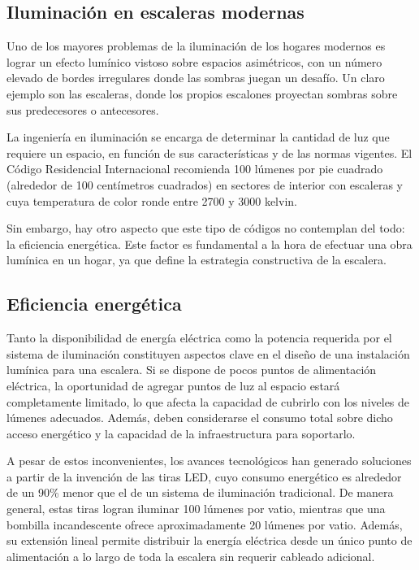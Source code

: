 \subsection{Iluminación en escaleras modernas}

Uno de los mayores problemas de la iluminación de los hogares modernos es lograr un efecto lumínico vistoso sobre espacios asimétricos, con un número elevado de bordes irregulares donde las sombras juegan un desafío. Un claro ejemplo son las escaleras, donde los propios escalones proyectan sombras sobre sus predecesores o antecesores. 

La ingeniería en iluminación se encarga de determinar la cantidad de luz que requiere un espacio, en función de sus características y de las normas vigentes. El Código Residencial Internacional \citep{CODRED} recomienda 100 lúmenes por pie cuadrado (alrededor de 100 centímetros cuadrados) en sectores de interior con escaleras y cuya temperatura de color ronde entre 2700 y 3000 kelvin.

Sin embargo, hay otro aspecto que este tipo de códigos no contemplan del todo: la eficiencia energética. Este factor es fundamental a la hora de efectuar una obra lumínica en un hogar, ya que define la estrategia constructiva de la escalera.

\subsection{Eficiencia energética}

Tanto la disponibilidad de energía eléctrica como la potencia requerida por el sistema de iluminación constituyen aspectos clave en el diseño de una instalación lumínica para una escalera. Si se dispone de pocos puntos de alimentación eléctrica, la oportunidad de agregar puntos de luz al espacio estará completamente limitado, lo que afecta la capacidad de cubrirlo con los niveles de lúmenes adecuados. Además, deben considerarse el consumo total sobre dicho acceso energético y la capacidad de la infraestructura para soportarlo.

A pesar de estos inconvenientes, los avances tecnológicos han generado soluciones a partir de la invención de las tiras LED, cuyo consumo energético es alrededor de un 90\% menor que el de un sistema de iluminación tradicional. De manera general, estas tiras logran iluminar 100 lúmenes por vatio, mientras que una bombilla incandescente ofrece aproximadamente 20 lúmenes por vatio. Además, su extensión lineal permite distribuir la energía eléctrica desde un único punto de alimentación a lo largo de toda la escalera sin requerir cableado adicional.

